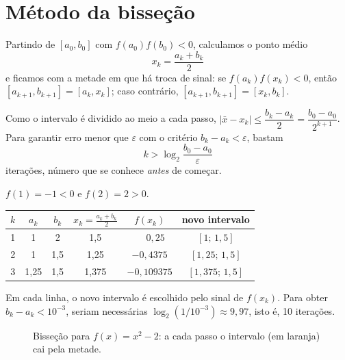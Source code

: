 \section{Método da bisseção}

Partindo de $[a_0,b_0]$ com $f(a_0)f(b_0)<0$, calculamos o ponto médio
\[
x_k=\frac{a_k+b_k}{2}
\]
e ficamos com a metade em que há troca de sinal: se $f(a_k)f(x_k)<0$, então
$[a_{k+1},b_{k+1}]=[a_k,x_k]$; caso contrário, $[a_{k+1},b_{k+1}]=[x_k,b_k]$.

\begin{proposicao}
Como o intervalo é dividido ao meio a cada passo,
$|\bar x-x_k|\le\dfrac{b_k-a_k}{2}=\dfrac{b_0-a_0}{2^{k+1}}$. Para garantir erro menor que
$\varepsilon$ com o critério $b_k-a_k<\varepsilon$, bastam
\[
k>\log_2\frac{b_0-a_0}{\varepsilon}
\]
iterações, número que se conhece \emph{antes} de começar.
\end{proposicao}

\begin{exemplo}[{: três iterações para $f(x)=x^2-2$ em $[1,2]$}]
$f(1)=-1<0$ e $f(2)=2>0$.
\begin{center}
\begin{tabular}{cccccc}
\toprule
$k$ & $a_k$ & $b_k$ & $x_k=\frac{a_k+b_k}{2}$ & $f(x_k)$ & novo intervalo\\
\midrule
1 & 1 & 2 & 1{,}5 & $\phantom{-}0{,}25$ & $[1;\,1{,}5]$\\
2 & 1 & 1{,}5 & 1{,}25 & $-0{,}4375$ & $[1{,}25;\,1{,}5]$\\
3 & 1{,}25 & 1{,}5 & 1{,}375 & $-0{,}109375$ & $[1{,}375;\,1{,}5]$\\
\bottomrule
\end{tabular}
\end{center}
Em cada linha, o novo intervalo é escolhido pelo sinal de $f(x_k)$. Para obter
$b_k-a_k<10^{-3}$, seriam necessárias $\log_2(1/10^{-3})\approx9{,}97$, isto é, 10 iterações.
\end{exemplo}

\begin{figure}[h]
\centering
{}
\caption{Bisseção para $f(x)=x^2-2$: a cada passo o intervalo (em laranja) cai pela metade.}
\end{figure}

